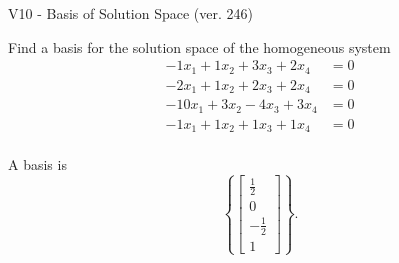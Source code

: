 \begin{exercise}
  \begin{exerciseTitle}V10 - Basis of Solution Space (ver. 246)\end{exerciseTitle}
  \begin{exerciseStatement}
    Find a basis for the solution space of the homogeneous system 
\begin{align*}
 -1 x_ 1 + 1 x_ 2 + 3 x_ 3 + 2 x_ 4 &= 0  \\ 
  -2 x_ 1 + 1 x_ 2 + 2 x_ 3 + 2 x_ 4 &= 0  \\ 
  -10 x_ 1 + 3 x_ 2 -4 x_ 3 + 3 x_ 4 &= 0  \\ 
  -1 x_ 1 + 1 x_ 2 + 1 x_ 3 + 1 x_ 4 &= 0  \\ 
 \end{align*}


 
  \end{exerciseStatement}

  \begin{exerciseAnswer}
   A basis is   
\[\left\{\left[\begin{array}{c}
\frac{1}{2} \\
0 \\
-\frac{1}{2} \\
1
\end{array}\right]\right\}.\]

  


  \end{exerciseAnswer}
\end{exercise}
